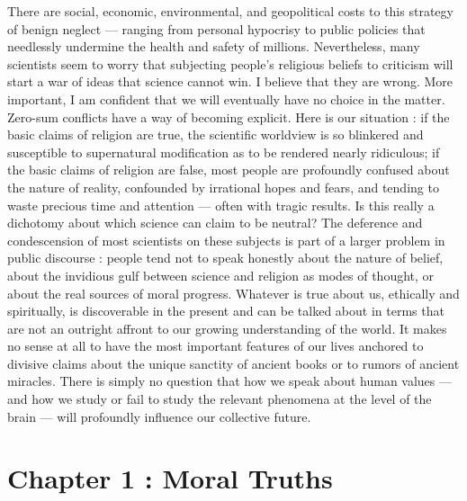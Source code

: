 \documentclass[a4paper,14pt]{extbook}
\begin{document}
There are social, economic, environmental, and geopolitical costs to this strategy of benign neglect --- ranging from personal hypocrisy to public policies that needlessly undermine the health and safety of millions.
Nevertheless, many scientists seem to worry that subjecting people's religious beliefs to criticism will start a war of ideas that science cannot win.
I believe that they are wrong.
More important, I am confident that we will eventually have no choice in the matter.
Zero-sum conflicts have a way of becoming explicit.
Here is our situation :
if the basic claims of religion are true, the scientific worldview is so blinkered and susceptible to supernatural modification as to be rendered nearly ridiculous;
if the basic claims of religion are false, most people are profoundly confused about the nature of reality, confounded by irrational hopes and fears, and tending to waste precious time and attention --- often with tragic results.
Is this really a dichotomy about which science can claim to be neutral?
The deference and condescension of most scientists on these subjects is part of a larger problem in public discourse :
people tend not to speak honestly about the nature of belief, about the invidious gulf between science and religion as modes of thought, or about the real sources of moral progress.
Whatever is true about us, ethically and spiritually, is discoverable in the present and can be talked about in terms that are not an outright affront to our growing understanding of the world.
It makes no sense at all to have the most important features of our lives anchored to divisive claims about the unique sanctity of ancient books or to rumors of ancient miracles.
There is simply no question that how we speak about human values --- and how we study or fail to study the relevant phenomena at the level of the brain --- will profoundly influence our collective future.

\newpage
\section{Chapter 1 : Moral Truths}
\end{document}
